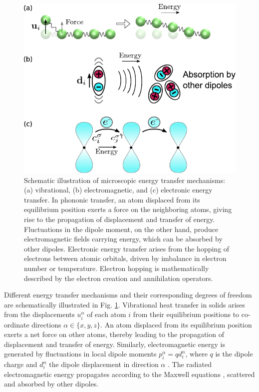 \begin{figure}
 \begin{center}
 \end{center}
  \includegraphics[width=.99\columnwidth]{inkscape/mechanisms.pdf}
 \caption{Schematic illustration of microscopic energy transfer mechanisms: (a) vibrational, (b) electromagnetic, and (c) electronic energy transfer. In phononic transfer, an atom displaced from its equilibrium position exerts a force on the neighboring atoms, giving rise to the propagation of displacement and transfer of energy. Fluctuations in the dipole moment, on the other hand, produce electromagnetic fields carrying energy, which can be absorbed by other dipoles. Electronic energy transfer arises from the hopping of electrons between atomic orbitals, driven by imbalance in electron number or temperature. Electron hopping is mathematically described by the electron creation and annihilation operators.}
 \label{fig:mechanisms}
\end{figure}

Different energy transfer mechanisms and their corresponding degrees of freedom are schematically illustrated in Fig. \ref{fig:mechanisms}. Vibrational heat transfer in solids arises from the displacements $u_i^{\alpha}$ of each atom $i$ from their equilibrium positions to co-ordinate directions $\alpha\in\{x,y,z\}$. An atom displaced from its equilibrium position exerts a net force on other atoms, thereby leading to the propagation of displacement and transfer of energy. Similarly, electromagnetic energy is generated by fluctuations in local dipole moments $p_i^{\alpha}=qd_i^{\alpha}$, where $q$ is the dipole charge and $d_i^{\alpha}$ the dipole displacement in direction $\alpha$ \cite{rosa10}. The radiated electromagnetic energy propagates according to the Maxwell equations \cite{novotny}, scattered and absorbed by other dipoles. 

